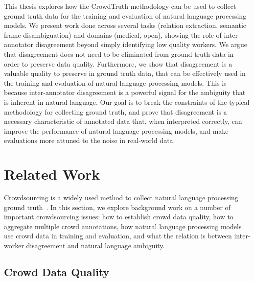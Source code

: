 This thesis explores how the CrowdTruth methodology can be used to collect ground truth data for the training and evaluation of natural language processing models. We present work done across several tasks (relation extraction, semantic frame disambiguation) and domains (medical, open), showing the role of inter-annotator disagreement beyond simply identifying low quality workers. We argue that disagreement does not need to be eliminated from ground truth data in order to preserve data quality. Furthermore, we show that disagreement is a valuable quality to preserve in ground truth data, that can be effectively used in the training and evaluation of natural language processing models. This is because inter-annotator disagreement is a powerful signal for the ambiguity that is inherent in natural language. Our goal is to break the constraints of the typical methodology for collecting ground truth, and prove that disagreement is a necessary characteristic of annotated data that, when interpreted correctly, can improve the performance of natural language processing models, and make evaluations more attuned to the noise in real-world data.


\section{Related Work}

Crowdsourcing is a widely used method to collect natural language processing ground truth~\cite{Sabou:2012:CRO:2362456.2362479}. In this section, we explore background work on a number of important crowdsourcing issues: how to establish crowd data quality, how to aggregate multiple crowd annotations, how natural language processing models use crowd data in training and evaluation, and what the relation is between inter-worker disagreement and natural language ambiguity.

\subsection{Crowd Data Quality}

